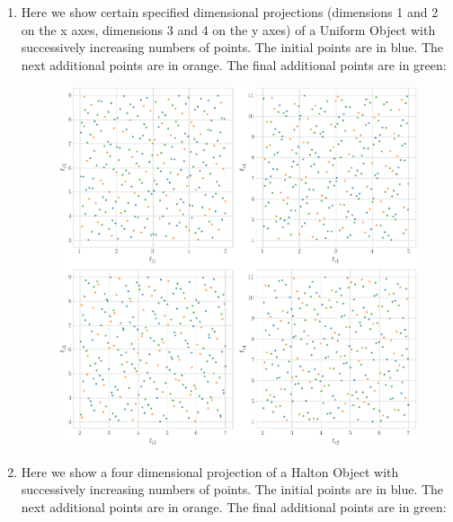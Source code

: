 \begin{enumerate}
\begin{figure}[H]
    \end{figure}
     \item Here we show certain specified dimensional projections (dimensions 1 and 2 on the x axes, dimensions 3 and 4 on the y axes) of a  Uniform Object with successively increasing numbers of points.  The initial points are in blue. The next additional points are in orange. The final additional points are in green:
    
     \begin{figure}[H]
    \centering
    \includegraphics[width=0.9\linewidth]{PlotProjectionsFunction/Figures/halton_uniform.png}
    \end{figure}
    \item Here we show a four dimensional projection of a Halton Object  with successively increasing numbers of points.  The initial points are in blue. The next additional points are in orange. The final additional points are in green:
    
     \begin{figure}[H]
    \centering

\end{figure}
\end{enumerate}

